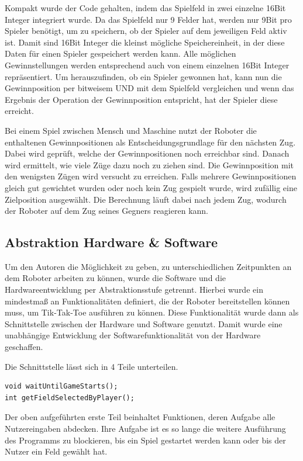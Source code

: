 \documentclass[conference,compsoc,final,a4paper]{IEEEtran}
\begin{document}
Kompakt wurde der Code gehalten, indem das Spielfeld in zwei einzelne 16Bit Integer integriert wurde.
Da das Spielfeld nur 9 Felder hat, werden nur 9Bit pro Spieler benötigt, um zu speichern, ob der Spieler
auf dem jeweiligen Feld aktiv ist. Damit sind 16Bit Integer die kleinst mögliche Speichereinheit, in der
diese Daten für einen Spieler gespeichert werden kann. Alle möglichen Gewinnstellungen werden entsprechend
auch von einem einzelnen 16Bit Integer repräsentiert. Um herauszufinden, ob ein Spieler gewonnen hat, kann
nun die Gewinnposition per bitweisem UND mit dem Spielfeld vergleichen und wenn das Ergebnis der Operation
der Gewinnposition entspricht, hat der Spieler diese erreicht.

Bei einem Spiel zwischen Mensch und Maschine nutzt der Roboter die enthaltenen Gewinnpositionen als
Entscheidungsgrundlage für den nächsten Zug. Dabei wird geprüft, welche der Gewinnpositionen noch erreichbar
sind. Danach wird ermittelt, wie viele Züge dazu noch zu ziehen sind. Die Gewinnposition mit den
wenigsten Zügen wird versucht zu erreichen. Falls mehrere Gewinnpositionen gleich gut gewichtet wurden
oder noch kein Zug gespielt wurde, wird zufällig eine Zielposition ausgewählt. Die Berechnung läuft
dabei nach jedem Zug, wodurch der Roboter auf dem Zug seines Gegners reagieren kann.

\subsection{Abstraktion Hardware & Software}

Um den Autoren die Möglichkeit zu geben, zu unterschiedlichen Zeitpunkten an dem Roboter arbeiten
zu können, wurde die Software und die Hardwareentwicklung per Abstraktionsstufe getrennt. Hierbei wurde
ein mindestmaß an Funktionalitäten definiert, die der Roboter bereitstellen können muss, um Tik-Tak-Toe
ausführen zu können. Diese Funktionalität wurde dann als Schnittstelle zwischen der Hardware und Software
genutzt. Damit wurde eine unabhängige Entwicklung der Softwarefunktionalität von der Hardware geschaffen.

Die Schnittstelle lässt sich in 4 Teile unterteilen.

\begin{verbatim}
void waitUntilGameStarts();
int getFieldSelectedByPlayer();
\end{verbatim}

Der oben aufgeführten erste Teil beinhaltet Funktionen, deren Aufgabe alle Nutzereingaben abdecken.
Ihre Aufgabe ist es so lange die weitere Ausführung des Programms zu blockieren,
bis ein Spiel gestartet werden kann oder bis der Nutzer ein Feld gewählt hat.
\end{document}
